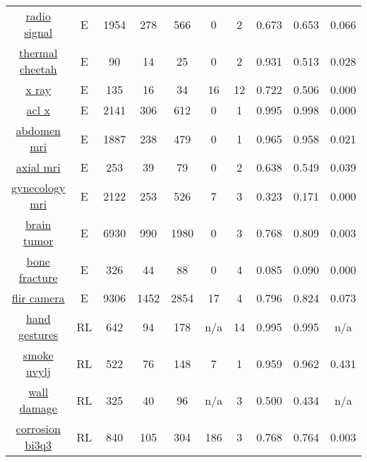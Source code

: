 \begin{longtable}{|| c | c | c c c | c c | c c c ||}
\cline{1-10}
\href{https://app.roboflow.com/roboflow-100/radio-signal/1}{radio signal} & E & 1954 & 278 & 566 & 0 & 2 & 0.673 & 0.653 & 0.066 \\
\cline{1-10}
\href{https://app.roboflow.com/roboflow-100/thermal-cheetah-my4dp/1}{thermal cheetah} & E & 90 & 14 & 25 & 0 & 2 & 0.931 & 0.513 & 0.028 \\
\cline{1-10}
\href{https://app.roboflow.com/roboflow-100/x-ray-rheumatology/1}{x ray} & E & 135 & 16 & 34 & 16 & 12 & 0.722 & 0.506 & 0.000 \\
\cline{1-10}
\href{https://app.roboflow.com/roboflow-100/acl-x-ray/1}{acl x} & E & 2141 & 306 & 612 & 0 & 1 & 0.995 & 0.998 & 0.000 \\
\cline{1-10}
\href{https://app.roboflow.com/roboflow-100/abdomen-mri/1}{abdomen mri} & E & 1887 & 238 & 479 & 0 & 1 & 0.965 & 0.958 & 0.021 \\
\cline{1-10}
\href{https://app.roboflow.com/roboflow-100/axial-mri/1}{axial mri} & E & 253 & 39 & 79 & 0 & 2 & 0.638 & 0.549 & 0.039 \\
\cline{1-10}
\href{https://app.roboflow.com/roboflow-100/gynecology-mri/1}{gynecology mri} & E & 2122 & 253 & 526 & 7 & 3 & 0.323 & 0.171 & 0.000 \\
\cline{1-10}
\href{https://app.roboflow.com/roboflow-100/brain-tumor-m2pbp/1}{brain tumor} & E & 6930 & 990 & 1980 & 0 & 3 & 0.768 & 0.809 & 0.003 \\
\cline{1-10}
\href{https://app.roboflow.com/roboflow-100/bone-fracture-7fylg/1}{bone fracture} & E & 326 & 44 & 88 & 0 & 4 & 0.085 & 0.090 & 0.000 \\
\cline{1-10}
\href{https://app.roboflow.com/roboflow-100/flir-camera-objects/1}{flir camera} & E & 9306 & 1452 & 2854 & 17 & 4 & 0.796 & 0.824 & 0.073 \\
\cline{1-10}
\href{https://app.roboflow.com/roboflow-100/hand-gestures-jps7z/1}{hand gestures} & RL & 642 & 94 & 178 & n/a & 14 & 0.995 & 0.995 & n/a \\
\cline{1-10}
\href{https://app.roboflow.com/roboflow-100/smoke-uvylj/1}{smoke uvylj} & RL & 522 & 76 & 148 & 7 & 1 & 0.959 & 0.962 & 0.431 \\
\cline{1-10}
\href{https://app.roboflow.com/roboflow-100/wall-damage/1}{wall damage} & RL & 325 & 40 & 96 & n/a & 3 & 0.500 & 0.434 & n/a \\
\cline{1-10}
\href{https://app.roboflow.com/roboflow-100/corrosion-bi3q3/1}{corrosion bi3q3} & RL & 840 & 105 & 304 & 186 & 3 & 0.768 & 0.764 & 0.003 \\

\end{longtable}
